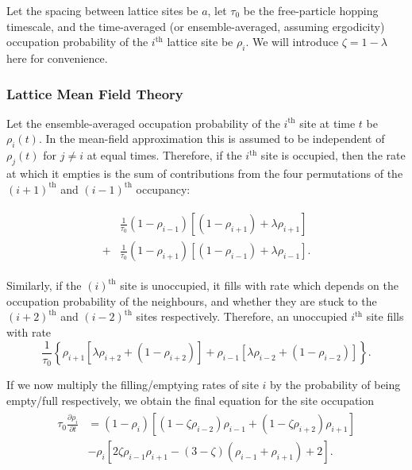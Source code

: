 \documentclass[
reprint, amsmath,amssymb,
]{revtex4-1}
\newcommand{\partDeriv}[2]{\frac{\partial #1}{\partial #2}}
\begin{document}
Let the spacing between lattice
sites be $a$, let $\tau_0$ be the free-particle hopping timescale, and
the time-averaged (or ensemble-averaged, assuming ergodicity)
occupation probability of the $i^{\mathrm{th}}$ lattice site be
$\rho_i$.  We will introduce $\zeta = 1 - \lambda $ here for convenience.

\subsubsection{Lattice Mean Field Theory} Let the ensemble-averaged occupation
probability of the $i^\mathrm{th}$ site at time $t$ be $\rho_i
(t)$. In the mean-field approximation this is assumed to be
independent of $\rho_j(t)$ for $j \neq i $ at equal times. Therefore,
if the $i^\mathrm{th}$ site is occupied, then the rate at which it empties
is the sum of contributions from the
four permutations of the $(i+1)^\mathrm{th}$ and
$(i-1)^\mathrm{th}$ occupancy: 

\begin{align}
\begin{split}
 &\frac{1}{\tau_0 } (1-\rho_{i-1})\left[ (1 - \rho_{i+1}) + \lambda \rho_{i+1} \right] \\
 +&\frac{1}{\tau_0 } (1-\rho_{i+1})\left[ (1 - \rho_{i-1}) + \lambda \rho_{i-1} \right] .
\end{split}
 \end{align}

Similarly, if the $(i)^\mathrm{th}$ site is unoccupied, it fills with
rate which depends on the occupation probability of the neighbours,
and whether they are stuck to the $(i+2)^\mathrm{th}$ and $(i-2)^\mathrm{th}$ sites
respectively. Therefore, an unoccupied $i^\mathrm{th}$ site fills with rate
\begin{equation}
\frac{1}{\tau_0 } \left\{ \rho_{i+1} \left[ \lambda \rho_{i+2} + (1-\rho_{i+2}) \right] + \rho_{i-1} \left[ \lambda \rho_{i-2} + (1-\rho_{i-2}) \right] \right\}.
\end{equation}

If we now multiply the filling/emptying rates of site $i$ by the
probability of being empty/full respectively, we obtain the
final equation for the site occupation 
\begin{align}
\label{eq:latticeMFT}
\begin{split}
 \tau_0 \partDeriv{\rho_i}{t} &= \left( 1-\rho_i \right) \left[ \left(1-\zeta\rho_{i-2} \right) \rho_{i-1} + \left(1-\zeta\rho_{i+2} \right) \rho_{i+1} \right] \\
 &- \rho_i \left[ 2 \zeta \rho_{i-1} \rho_{i+1}  - (3-\zeta)\left(\rho_{i-1} + \rho_{i+1}\right) + 2 \right].
 \end{split}
 \end{align}
\end{document}

